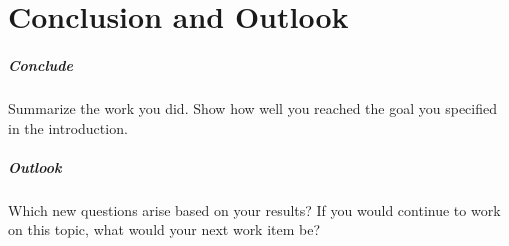 \chapter{Conclusion and Outlook}
\paragraph{Conclude}
Summarize the work you did. Show how well you reached the goal you
specified in the introduction.

\paragraph{Outlook}
Which new questions arise based on your results? If you would continue
to work on this topic, what would your next work item be?

